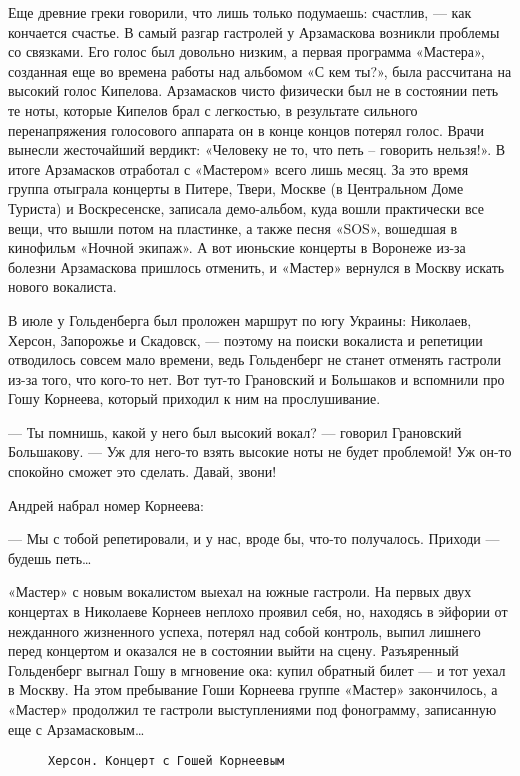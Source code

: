 Еще древние греки говорили, что лишь только подумаешь: счастлив, — как кончается счастье. В самый разгар гастролей у
Арзамаскова возникли проблемы со связками. Его голос был довольно низким, а первая программа «Мастера», созданная еще во
времена работы над альбомом «С кем ты?», была рассчитана на высокий голос Кипелова. Арзамасков чисто физически был не в
состоянии петь те ноты, которые Кипелов брал с легкостью, в результате сильного перенапряжения голосового аппарата он в
конце концов потерял голос. Врачи вынесли жесточайший вердикт: «Человеку не то, что петь – говорить нельзя!». В итоге
Арзамасков отработал с «Мастером» всего лишь месяц. За это время группа отыграла концерты в Питере, Твери, Москве (в
Центральном Доме Туриста) и Воскресенске, записала демо-альбом, куда вошли практически все вещи, что вышли потом на
пластинке, а также песня «SOS», вошедшая в кинофильм «Ночной экипаж». А вот июньские концерты в Воронеже из-за болезни
Арзамаскова пришлось отменить, и «Мастер» вернулся в Москву искать нового вокалиста.

В июле у Гольденберга был проложен маршрут по югу Украины: Николаев, Херсон, Запорожье и Скадовск, — поэтому на поиски
вокалиста и репетиции отводилось совсем мало времени, ведь Гольденберг не станет отменять гастроли из-за того, что
кого-то нет. Вот тут-то Грановский и Большаков и вспомнили про Гошу Корнеева, который приходил к ним на прослушивание.

— Ты помнишь, какой у него был высокий вокал? — говорил Грановский Большакову. — Уж для него-то взять высокие ноты не
будет проблемой! Уж он-то спокойно сможет это сделать. Давай, звони!

Андрей набрал номер Корнеева:

— Мы с тобой репетировали, и у нас, вроде бы, что-то получалось. Приходи — будешь петь\ldots

«Мастер» с новым вокалистом выехал на южные гастроли. На первых двух концертах в Николаеве Корнеев неплохо проявил себя,
но, находясь в эйфории от нежданного жизненного успеха, потерял над собой контроль, выпил лишнего перед концертом и
оказался не в состоянии выйти на сцену. Разъяренный Гольденберг выгнал Гошу в мгновение ока: купил обратный билет — и
тот уехал в Москву. На этом пребывание Гоши Корнеева группе «Мастер» закончилось, а «Мастер» продолжил те гастроли
выступлениями под фонограмму, записанную еще с Арзамасковым\ldots

\begin{figure}[h]
    \centering
    \caption{\texttt{Херсон. Концерт с Гошей Корнеевым}}
\end{figure}

